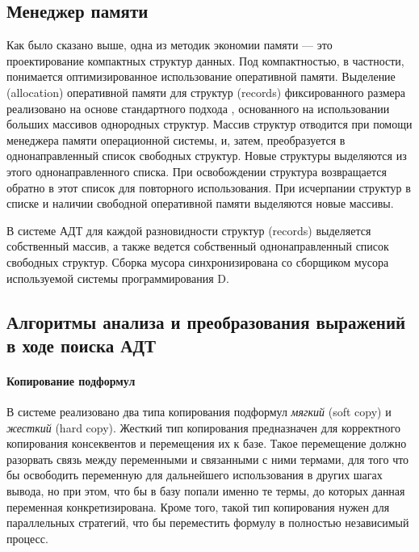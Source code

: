 \subsection{Менеджер памяти}

Как было сказано выше, одна из методик экономии памяти --- это проектирование компактных структур данных. Под компактностью, в частности, понимается оптимизированное использование оперативной памяти. Выделение (allocation) оперативной памяти для структур (records) фиксированного размера реализовано на основе стандартного подхода \cite{}, основанного на использовании больших массивов однородных структур. Массив структур отводится при помощи менеджера памяти операционной системы, и, затем, преобразуется в однонаправленный список свободных структур. Новые структуры выделяются из этого однонаправленного списка. При освобождении структура возвращается обратно в этот список для повторного использования. При исчерпании структур в списке и наличии свободной оперативной памяти выделяются новые массивы.

В системе АДТ для каждой разновидности структур (records) выделяется собственный массив, а также ведется собственный однонаправленный список свободных структур. Сборка мусора синхронизирована со сборщиком мусора используемой системы программирования D.

\subsection{Алгоритмы анализа и преобразования выражений в ходе поиска АДТ}

\paragraph{Копирование подформул}
В системе реализовано два типа копирования подформул \emph{мягкий} (soft copy) и \emph{жесткий} (hard copy). Жесткий тип копирования предназначен для корректного копирования консеквентов и перемещения их к базе. Такое перемещение должно разорвать связь между переменными и связанными с ними термами, для того что бы освободить переменную для дальнейшего использования в других шагах вывода, но при этом, что бы в базу попали именно те термы, до которых данная переменная конкретизирована. Кроме того, такой тип копирования нужен для параллельных стратегий, что бы переместить формулу в полностью независимый процесс.

